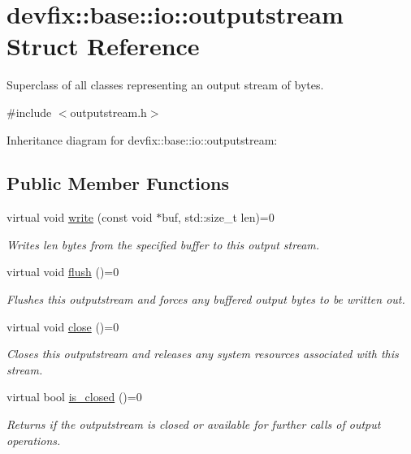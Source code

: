 \hypertarget{structdevfix_1_1base_1_1io_1_1outputstream}{}\section{devfix\+:\+:base\+:\+:io\+:\+:outputstream Struct Reference}
\label{structdevfix_1_1base_1_1io_1_1outputstream}


Superclass of all classes representing an output stream of bytes.  




{\ttfamily \#include $<$outputstream.\+h$>$}



Inheritance diagram for devfix\+:\+:base\+:\+:io\+:\+:outputstream\+:
\subsection*{Public Member Functions}
\begin{DoxyCompactItemize}
\item 
virtual void \hyperlink{structdevfix_1_1base_1_1io_1_1outputstream_ac7e5fcd6883c7c8f53356a4eb8284c00}{write} (const void $\ast$buf, std\+::size\+\_\+t len)=0
\begin{DoxyCompactList}\small\item\em Writes len bytes from the specified buffer to this output stream. \end{DoxyCompactList}\item 
virtual void \hyperlink{structdevfix_1_1base_1_1io_1_1outputstream_a3fe3b34675a2d70331e6ca235388e0cc}{flush} ()=0
\begin{DoxyCompactList}\small\item\em Flushes this {\itshape outputstream} and forces any buffered output bytes to be written out. \end{DoxyCompactList}\item 
virtual void \hyperlink{structdevfix_1_1base_1_1io_1_1outputstream_a060c2e7040e6bb831b8150f64bd8abf7}{close} ()=0
\begin{DoxyCompactList}\small\item\em Closes this {\itshape outputstream} and releases any system resources associated with this stream. \end{DoxyCompactList}\item 
virtual bool \hyperlink{structdevfix_1_1base_1_1io_1_1outputstream_a52bd2eac8f6fbc496eab5138a48d2f06}{is\+\_\+closed} ()=0
\begin{DoxyCompactList}\small\item\em Returns if the {\itshape outputstream} is closed or available for further calls of output operations. \end{DoxyCompactList}\end{DoxyCompactItemize}


